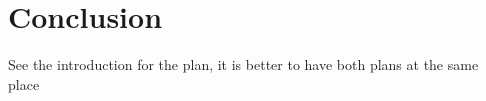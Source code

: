\chapter{Conclusion}
\label{ch:conclusion}


See the introduction for the plan, it is better to have both  plans at the same place